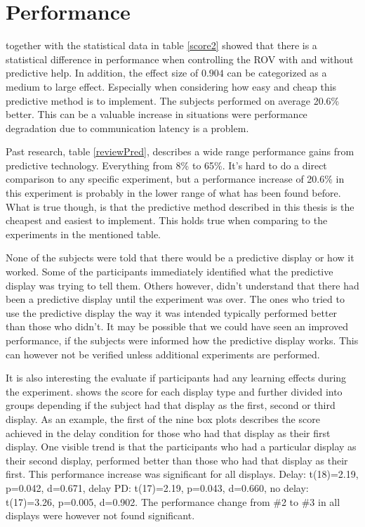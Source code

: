 \section{Performance}

 together with the statistical data in table \ref{score2} showed that there is a statistical difference in performance when controlling the ROV with and without predictive help. In addition, the effect size of $0.904$ can be categorized as a medium to large effect. Especially when considering how easy and cheap this predictive method is to implement. The subjects performed on average 20.6\% better. This can be a valuable increase in situations were performance degradation due to communication latency is a problem.

Past research, table \ref{reviewPred}, describes a wide range performance gains from predictive technology. Everything from 8\% to 65\%. It's hard to do a direct comparison to any specific experiment, but a performance increase of 20.6\% in this experiment is probably in the lower range of what has been found before. What is true though, is that the predictive method described in this thesis is the cheapest and easiest to implement. This holds true when comparing to the experiments in the mentioned table.

None of the subjects were told that there would be a predictive display or how it worked. Some of the participants immediately identified what the predictive display was trying to tell them. Others however, didn't understand that there had been a predictive display until the experiment was over. The ones who tried to use the predictive display the way it was intended typically performed better than those who didn't. It may be possible that we could have seen an improved performance, if the subjects were informed how the predictive display works. This can however not be verified unless additional experiments are performed.

It is also interesting the evaluate if participants had any learning effects during the experiment.  shows the score for each display type and further divided into groups depending if the subject had that display as the first, second or third display. As an example, the first of the nine box plots describes the score achieved in the delay condition for those who had that display as their first display. One visible trend is that the participants who had a particular display as their second display, performed better than those who had that display as their first. This performance increase was significant for all displays. Delay: t(18)=2.19, p=0.042, d=0.671, delay PD: t(17)=2.19, p=0.043, d=0.660, no delay: t(17)=3.26, p=0.005, d=0.902. The performance change from \#2 to \#3 in all displays were however not found significant.

